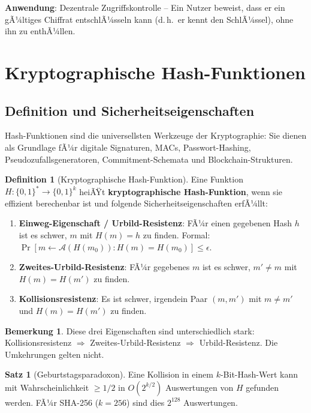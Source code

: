 ﻿\documentclass[a4paper,12pt]{scrreprt}
\theoremstyle{definition}
\newtheorem{definition}{Definition}[section]
\newtheorem{bemerkung}{Bemerkung}[section]
\newtheorem{satz}{Satz}[section]
\begin{document}
\textbf{Anwendung}: Dezentrale Zugriffskontrolle -- Ein Nutzer beweist, dass er ein gÃ¼ltiges Chiffrat entschlÃ¼sseln kann (d.\,h.\ er kennt den SchlÃ¼ssel), ohne ihn zu enthÃ¼llen.

\section{Kryptographische Hash-Funktionen}

\subsection{Definition und Sicherheitseigenschaften}

Hash-Funktionen sind die universellsten Werkzeuge der Kryptographie: Sie dienen als Grundlage fÃ¼r digitale Signaturen, MACs, Passwort-Hashing, Pseudozufallsgeneratoren, Commitment-Schemata und Blockchain-Strukturen.

\begin{definition}[Kryptographische Hash-Funktion]
Eine Funktion $H: \{0,1\}^* \to \{0,1\}^k$ heiÃŸt \textbf{kryptographische Hash-Funktion}, wenn sie effizient berechenbar ist und folgende Sicherheitseigenschaften erfÃ¼llt:
\begin{enumerate}
    \item \textbf{Einweg-Eigenschaft / Urbild-Resistenz}: FÃ¼r einen gegebenen Hash $h$ ist es schwer, $m$ mit $H(m) = h$ zu finden. Formal: $\Pr[m \leftarrow \mathcal{A}(H(m_0)) : H(m) = H(m_0)] \leq \epsilon$.
    \item \textbf{Zweites-Urbild-Resistenz}: FÃ¼r gegebenes $m$ ist es schwer, $m' \neq m$ mit $H(m) = H(m')$ zu finden.
    \item \textbf{Kollisionsresistenz}: Es ist schwer, irgendein Paar $(m, m')$ mit $m \neq m'$ und $H(m) = H(m')$ zu finden.
\end{enumerate}
\end{definition}

\begin{bemerkung}
Diese drei Eigenschaften sind unterschiedlich stark: Kollisionsresistenz $\Rightarrow$ Zweites-Urbild-Resistenz $\Rightarrow$ Urbild-Resistenz. Die Umkehrungen gelten nicht.
\end{bemerkung}

\begin{satz}[Geburtstagsparadoxon]
Eine Kollision in einem $k$-Bit-Hash-Wert kann mit Wahrscheinlichkeit $\geq 1/2$ in $O(2^{k/2})$ Auswertungen von $H$ gefunden werden. FÃ¼r SHA-256 ($k=256$) sind dies $2^{128}$ Auswertungen.
\end{satz}
\end{document}
